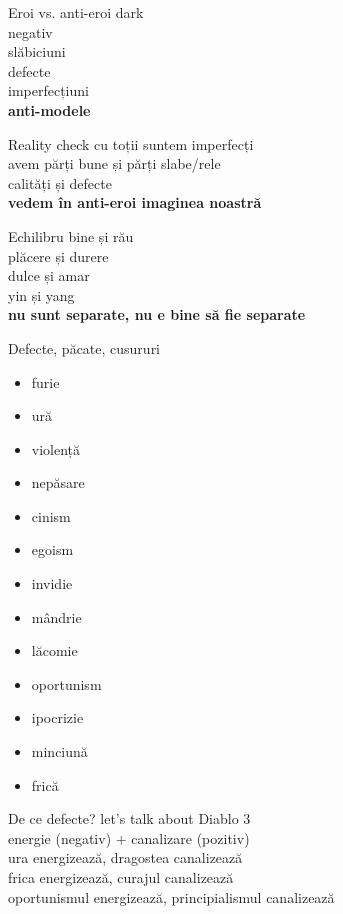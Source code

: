 \documentclass{beamer}
\begin{document}
\begin{frame}{Eroi vs. anti-eroi}
  \centering
  \Large
  \pause dark \\
  \pause negativ \\
  \pause slăbiciuni \\
  \pause defecte \\
  \pause imperfecțiuni \\
  \pause \textbf{anti-modele}
\end{frame}

\begin{frame}{Reality check}
  \centering
  \Large
  \pause cu toții suntem imperfecți \\
  \pause avem părți bune și părți slabe/rele \\
  \pause calități și defecte \\
  \pause \textbf{vedem în anti-eroi imaginea noastră}
\end{frame}

\begin{frame}{Echilibru}
  \centering
  \Large
  \pause bine și rău \\
  \pause plăcere și durere \\
  \pause dulce și amar \\
  \pause yin și yang \\
  \pause \textbf{nu sunt separate, nu e bine să fie separate}
\end{frame}

\begin{frame}{Defecte, păcate, cusururi}
  \begin{itemize}
    \item furie
    \item ură
    \item violență
    \item nepăsare
    \item cinism
    \item egoism
    \item invidie
    \item mândrie
    \item lăcomie
    \item oportunism
    \item ipocrizie
    \item minciună
    \item frică
  \end{itemize}
\end{frame}

\begin{frame}{De ce defecte?}
  \centering
  \Large
  \pause let's talk about Diablo 3 \\
  \pause energie (negativ) + canalizare (pozitiv) \\
  \pause ura energizează, dragostea canalizează \\
  \pause frica energizează, curajul canalizează \\
  \pause oportunismul energizează, principialismul canalizează
\end{frame}
\end{document}
